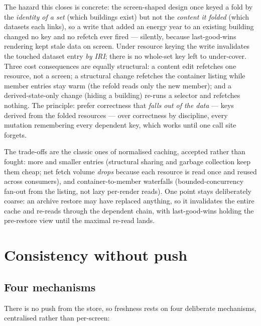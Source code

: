 \documentclass[11pt,a4paper]{article}
\theoremstyle{remark}
\begin{document}
The hazard this closes is concrete: the screen-shaped design once keyed a fold by
the \emph{identity of a set} (which buildings exist) but not the \emph{content it
folded} (which datasets each links), so a write that added an energy year to an
existing building changed no key and no refetch ever fired --- silently, because
last-good-wins rendering kept stale data on screen. Under resource keying the
write invalidates the touched dataset entry \emph{by IRI}; there is no whole-set
key left to under-cover. Three cost consequences are equally structural: a
content edit refetches one resource, not a screen; a structural change refetches
the container listing while member entries stay warm (the refold reads only the
new member); and a derived-state-only change (hiding a building) re-runs a
selector and refetches nothing. The principle: prefer correctness that
\emph{falls out of the data} --- keys derived from the folded resources --- over
correctness by discipline, every mutation remembering every dependent key, which
works until one call site forgets.

The trade-offs are the classic ones of normalised caching, accepted rather than
fought: more and smaller entries (structural sharing and garbage collection keep
them cheap; net fetch volume \emph{drops} because each resource is read once and
reused across consumers), and container-to-member waterfalls (bounded-concurrency
fan-out from the listing, not lazy per-render reads). One point stays
deliberately coarse: an archive restore may have replaced anything, so it
invalidates the entire cache and re-reads through the dependent chain, with
last-good-wins holding the pre-restore view until the maximal re-read lands.

\section{Consistency without push}\label{sec:consistency}

\subsection{Four mechanisms}\label{sec:mechanisms}

There is no push from the store, so freshness rests on four deliberate
mechanisms, centralised rather than per-screen:
\end{document}
